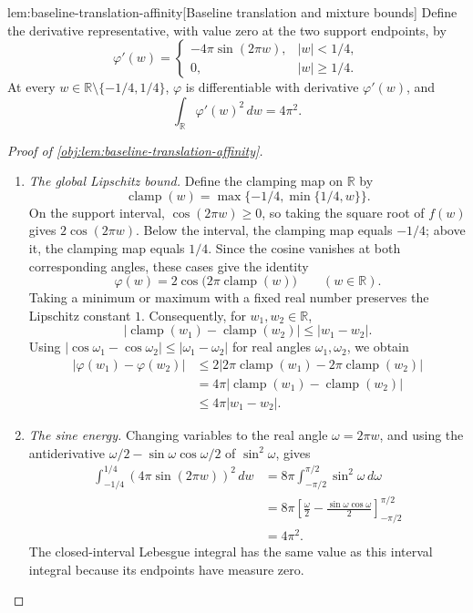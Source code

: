 \documentclass[11pt]{article}
\begin{document}
\begin{lemmav}{lem:baseline-translation-affinity}[Baseline translation and mixture bounds]
Define the derivative representative, with value zero at the two support endpoints, by
\[
\varphi'(w)=
\begin{cases}
-4\pi\sin(2\pi w),& |w|<1/4,\\
0,& |w|\ge 1/4.
\end{cases}
\]
At every \(w\in\mathbb R\setminus\{-1/4,1/4\}\), \(\varphi\) is differentiable with derivative \(\varphi'(w)\), and
\[
\int_{\mathbb R}\varphi'(w)^2\,dw=4\pi^2.
\]
\end{lemmav}

\begin{proof}[Proof of \cref{obj:lem:baseline-translation-affinity}]
\begin{enumerate}
\item \emph{The global Lipschitz bound.}
Define the clamping map on \(\mathbb R\) by
\[
\operatorname{clamp}(w)
=\max\{-1/4,\min\{1/4,w\}\}.
\]
On the support interval, \(\cos(2\pi w)\ge0\), so taking the square root of \(f(w)\) gives \(2\cos(2\pi w)\). Below the interval, the clamping map equals \(-1/4\); above it, the clamping map equals \(1/4\). Since the cosine vanishes at both corresponding angles, these cases give the identity
\[
\varphi(w)=2\cos\bigl(2\pi\operatorname{clamp}(w)\bigr)
\qquad(w\in\mathbb R).
\]
Taking a minimum or maximum with a fixed real number preserves the Lipschitz constant \(1\). Consequently, for \(w_1,w_2\in\mathbb R\),
\[
\bigl|\operatorname{clamp}(w_1)-\operatorname{clamp}(w_2)\bigr|
\le |w_1-w_2|.
\]
Using \(|\cos \omega_1-\cos \omega_2|\le|\omega_1-\omega_2|\) for real angles \(\omega_1,\omega_2\), we obtain
\[
\begin{aligned}
|\varphi(w_1)-\varphi(w_2)|
&\le 2\bigl|2\pi\operatorname{clamp}(w_1)
             -2\pi\operatorname{clamp}(w_2)\bigr|\\
&=4\pi\bigl|\operatorname{clamp}(w_1)
             -\operatorname{clamp}(w_2)\bigr|\\
&\le4\pi|w_1-w_2|.
\end{aligned}
\]

\item \emph{The sine energy.}
Changing variables to the real angle \(\omega=2\pi w\), and using the antiderivative
\(\omega/2-\sin\omega\cos\omega/2\) of \(\sin^2\omega\), gives
\[
\begin{aligned}
\int_{-1/4}^{1/4}(4\pi\sin(2\pi w))^2\,dw
&=8\pi\int_{-\pi/2}^{\pi/2}\sin^2\omega\,d\omega\\
&=8\pi
  \left[\frac{\omega}{2}
        -\frac{\sin\omega\cos\omega}{2}\right]_{-\pi/2}^{\pi/2}\\
&=4\pi^2.
\end{aligned}
\]
The closed-interval Lebesgue integral has the same value as this interval integral because its endpoints have measure zero.


\end{enumerate}
\end{proof}
\end{document}
